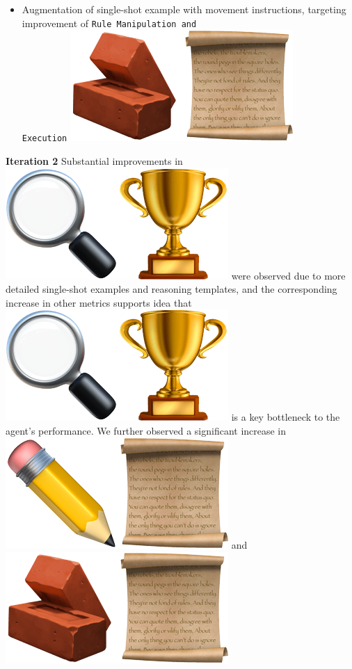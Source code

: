 \begin{itemize}
	\item Augmentation of single-shot example with movement instructions,
		targeting improvement of \texttt{Rule Manipulation and \\Execution}
		\includegraphics[scale=0.07]{figs/emojis/emoji_7.png}
\end{itemize}

\textbf{Iteration 2} Substantial improvements in
\includegraphics[scale=0.07]{figs/emojis/emoji_1.png}
were observed due to more detailed single-shot examples and reasoning templates,
and the corresponding increase in other metrics supports idea that
\includegraphics[scale=0.07]{figs/emojis/emoji_1.png}
is a key bottleneck to the agent's performance. We further observed a
significant increase in
\includegraphics[scale=0.07]{figs/emojis/emoji_2.png}
and
\includegraphics[scale=0.07]{figs/emojis/emoji_7.png}
